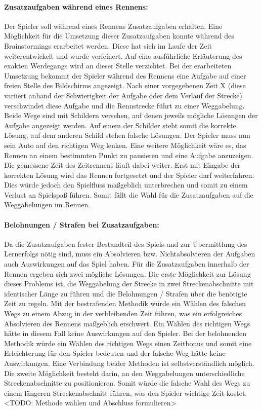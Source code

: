 		\paragraph{Zusatzaufgaben während eines Rennens:}
		Der Spieler soll während eines Rennens Zusatzaufgaben erhalten. Eine Möglichkeit für die Umsetzung dieser Zusatzaufgaben konnte während des Brainstormings erarbeitet werden. Diese hat sich im Laufe der Zeit weiterentwickelt und wurde verfeinert. Auf eine ausführliche Erläuterung des exakten Werdegangs wird an dieser Stelle verzichtet.
		Bei der erarbeiteten Umsetzung bekommt der Spieler während des Rennens eine Aufgabe auf einer freien Stelle des Bildschirms angezeigt. Nach einer vorgegebenen Zeit X (diese variiert anhand der Schwierigkeit der Aufgabe oder dem Verlauf der Strecke) verschwindet diese Aufgabe und die Rennstrecke führt zu einer Weggabelung. Beide Wege sind mit Schildern versehen, auf denen jeweils mögliche Lösungen der Aufgabe angezeigt werden. Auf einem der Schilder steht somit die korrekte Lösung, auf dem anderen Schild stehen falsche Lösungen. Der Spieler muss nun sein Auto auf den richtigen Weg lenken.
		Eine weitere Möglichkeit wäre es, das Rennen an einem bestimmten Punkt zu pausieren und eine Aufgabe anzuzeigen. Die gemessene Zeit des Zeitrennens läuft dabei weiter. Erst mit Eingabe der korrekten Lösung wird das Rennen fortgesetzt und der Spieler darf weiterfahren. Dies würde jedoch den Spielfluss maßgeblich unterbrechen und somit zu einem Verlust an Spielspaß führen. Somit fällt die Wahl für die Zusatzaufgaben auf die Weggabelungen im Rennen.

		\paragraph{Belohnungen / Strafen bei Zusatzaufgaben:}
		Da die Zusatzaufgaben fester Bestandteil des Spiels und zur Übermittlung des Lernerfolgs nötig sind, muss ein Absolvieren bzw. Nichtabsolvieren der Aufgaben auch Auswirkungen auf das Spiel haben. Für die Zusatzaufgaben innerhalb der Rennen ergeben sich zwei mögliche Lösungen.
		Die erste Möglichkeit zur Lösung dieses Problems ist, die Weggabelung der Strecke in zwei Streckenabschnitte mit identischer Länge zu führen und die Belohnungen / Strafen über die benötigte Zeit zu regeln. Mit der bestrafenden Methodik würde ein Wählen des falschen Wegs zu einem Abzug in der verbleibenden Zeit führen, was ein erfolgreiches Absolvieren des Rennens maßgeblich erschwert. Ein Wählen des richtigen Wegs hätte in diesem Fall keine Auswirkungen auf den Spieler.
		Bei der belohnenden Methodik würde ein Wählen des richtigen Wegs einen Zeitbonus und somit eine Erleichterung für den Spieler bedeuten und der falsche Weg hätte keine Auswirkungen. Eine Verbindung beider Methoden ist selbstverständlich möglich.
		Die zweite Möglichkeit besteht darin, an den Weggabelungen unterschiedliche Streckenabschnitte zu positionieren. Somit würde die falsche Wahl des Wegs zu einem längeren Streckenabschnitt führen, was den Spieler wichtige Zeit kostet.
		<TODO: Methode wählen und Abschluss formulieren>

